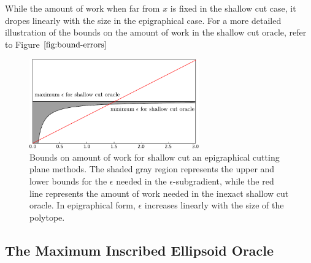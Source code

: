 \begin{example}
While the amount of work when far from $x$ is fixed
in the shallow cut case, it dropes linearly with the size in the epigraphical
case. For a more detailed illustration of the bounds on the amount of work
in the shallow cut oracle, refer to Figure $\ref{fig:bound-errors}$

\begin{figure}
\begin{centering}
\includegraphics[width=0.65\textwidth]{cutting/epsilon_absx.pdf}
\par\end{centering}
\caption{Bounds on amount of work for shallow cut an epigraphical
cutting plane methods. The shaded gray region represents the
upper and lower bounds for the $\epsilon$ needed in the $\epsilon$-subgradient,
while the red line represents the amount of work needed in the inexact shallow
cut oracle. In epigraphical form, $\epsilon$ increases linearly with the size of the polytope.}\label{fig:bound-errors}
\end{figure} 

\end{example}

\subsection{The Maximum Inscribed Ellipsoid Oracle} 

